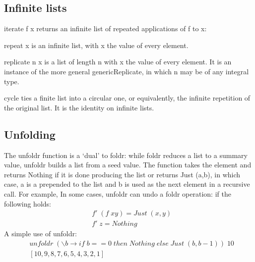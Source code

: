 \subsection{Infinite lists}
iterate f x returns an infinite list of repeated applications of f to x:

repeat x is an infinite list, with x the value of every element.

replicate n x is a list of length n with x the value of every element. It is an instance of the more general genericReplicate, in which n may be of any integral type.

cycle ties a finite list into a circular one, or equivalently, the infinite repetition of the original list. It is the identity on infinite lists.

\subsection{Unfolding}
The unfoldr function is a `dual' to foldr: while foldr reduces a list to a summary value, unfoldr builds a list from a seed value. The function takes the element and returns Nothing if it is done producing the list or returns Just (a,b), in which case, a is a prepended to the list and b is used as the next element in a recursive call. For example,
In some cases, unfoldr can undo a foldr operation:
if the following holds:
\begin{align*}
	&f'\; (f\; x y) = Just\; (x,y)\\
	&f'\; z       = Nothing
\end{align*}
A simple use of unfoldr:
\begin{align*}
	&unfoldr\; (\backslash b \rightarrow if\; b == 0\; then\; Nothing\; else\; Just\; (b, b-1))\; 10\\
	&[10,9,8,7,6,5,4,3,2,1]
\end{align*}
